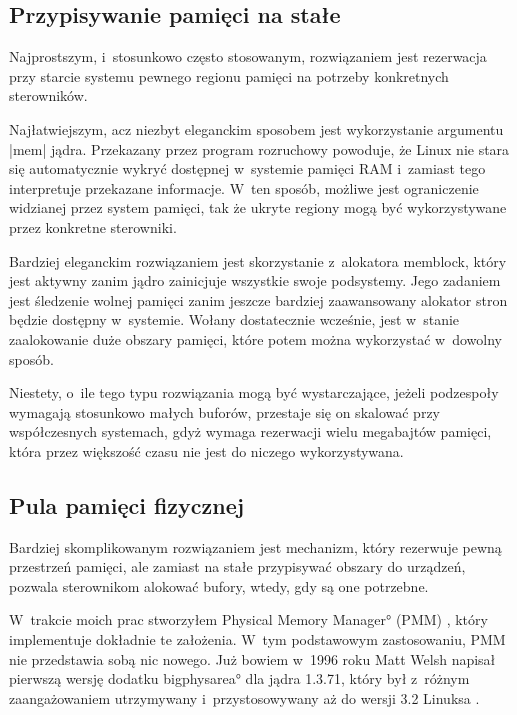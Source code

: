 \subsection{Przypisywanie pamięci na stałe}

Najprostszym, i~stosunkowo często stosowanym, rozwiązaniem jest
rezerwacja przy starcie systemu pewnego regionu pamięci na potrzeby
konkretnych sterowników.

Najłatwiejszym, acz niezbyt eleganckim sposobem jest wykorzystanie
argumentu \code|mem| jądra.  Przekazany przez program rozruchowy
powoduje, że Linux nie stara się automatycznie wykryć dostępnej
w~systemie pamięci RAM i~zamiast tego interpretuje przekazane
informacje.  W~ten sposób, możliwe jest ograniczenie widzianej przez
system pamięci, tak że ukryte regiony mogą być wykorzystywane przez
konkretne sterowniki.

Bardziej eleganckim rozwiązaniem jest skorzystanie z~alokatora
memblock, który jest aktywny zanim jądro zainicjuje wszystkie swoje
podsystemy.  Jego zadaniem jest śledzenie wolnej pamięci zanim jeszcze
bardziej zaawansowany alokator stron będzie dostępny w~systemie.
Wołany dostatecznie wcześnie, jest w~stanie zaalokowanie duże obszary
pamięci, które potem można wykorzystać w~dowolny sposób.

Niestety, o~ile tego typu rozwiązania mogą być wystarczające, jeżeli
podzespoły wymagają stosunkowo małych buforów, przestaje się on
skalować przy współczesnych systemach, gdyż wymaga rezerwacji wielu
megabajtów pamięci, która przez większość czasu nie jest do niczego
wykorzystywana.

\subsection{Pula pamięci fizycznej}\label{sec:intro-pmm}

Bardziej skomplikowanym rozwiązaniem jest mechanizm, który rezerwuje
pewną przestrzeń pamięci, ale zamiast na stałe przypisywać obszary do
urządzeń, pozwala sterownikom alokować bufory, wtedy, gdy są one
potrzebne.

W~trakcie moich prac stworzyłem \ang*{Physical Memory Manager} (PMM)
\autocite{patch:pmm}, który implementuje dokładnie te założenia. W~tym
podstawowym zastosowaniu, PMM nie przedstawia sobą nic nowego.  Już
bowiem w~1996 roku Matt Welsh napisał pierwszą wersję dodatku
\ang*{bigphysarea} dla jądra 1.3.71, który był z~różnym zaangażowaniem
utrzymywany i~przystosowywany aż do wersji 3.2 Linuksa
\autocite{patch:bigphys}.

